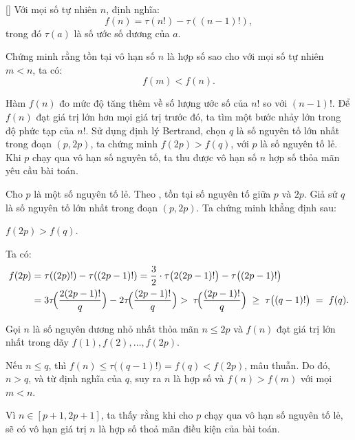 \documentclass[../04-diophantine-equations.tex]{subfiles}
\begin{document}
\begin{example*}\label{example:CHN-2015-TST3-D2-P3}[\textbf{}]
	Với mọi số tự nhiên \( n \), định nghĩa:
	\[
		f(n) = \tau(n!) - \tau((n-1)!),
	\]
	trong đó \( \tau(a) \) là số ước số dương của \( a \).  
	
	Chứng minh rằng tồn tại vô hạn số \( n \) là hợp số sao cho với mọi số tự nhiên \( m < n \), ta có:
	\[
		f(m) < f(n).
	\]
\end{example*}

\begin{story*}
    Hàm \( f(n) \) đo mức độ tăng thêm về số lượng ước số của \( n! \) so với \( (n-1)! \).  
    Để \( f(n) \) đạt giá trị lớn hơn mọi giá trị trước đó, ta tìm một bước nhảy lớn trong độ phức tạp của \( n! \).  
    Sử dụng định lý Bertrand, chọn \( q \) là số nguyên tố lớn nhất trong đoạn \( (p, 2p) \), ta chứng minh \( f(2p) > f(q) \), với \( p \) là số nguyên tố lẻ.  
    Khi \( p \) chạy qua vô hạn số nguyên tố, ta thu được vô hạn số \( n \) hợp số thỏa mãn yêu cầu bài toán.
\end{story*}

\begin{soln}\footnotemark
	Cho \( p \) là một số nguyên tố lẻ. Theo , tồn tại số nguyên tố giữa \( p \) và \( 2p \).  
	Giả sử \( q \) là số nguyên tố lớn nhất trong đoạn \( (p, 2p) \).  
	Ta chứng minh khẳng định sau:

	\begin{claim*}
		\( f(2p) > f(q) \).
	\end{claim*}

	\begin{subproof}
		Ta có:
		\[
			\begin{aligned} 
				f(2p) &= \tau((2p)!) - \tau((2p-1)!) 
				= \frac{3}{2} \cdot \tau\bigl(2(2p-1)!\bigr) - \tau\bigl((2p-1)!\bigr) \\ 
			 	&= 3\tau\!\Bigl(\frac{2(2p-1)!}{q}\Bigr) - 2\tau\!\Bigl(\frac{(2p-1)!}{q}\Bigr) 
			  	>\; \tau\!\Bigl(\frac{(2p-1)!}{q}\Bigr) \;\geq\; \tau\bigl((q-1)!\bigr) \;=\; f(q).
			\end{aligned}
		\]
	\end{subproof}

	Gọi \( n \) là số nguyên dương nhỏ nhất thỏa mãn \( n \leq 2p \) và \( f(n) \) đạt giá trị lớn nhất trong dãy \( f(1), f(2), \dots, f(2p) \).  
			
	Nếu \( n \leq q \), thì \( f(n) \leq \tau\bigl((q-1)!\bigr) = f(q) < f(2p) \), mâu thuẫn.  
	Do đó, \( n > q \), và từ định nghĩa của \( q \), suy ra \( n \) là hợp số và \( f(n) > f(m) \) với mọi \( m < n \). 
	
	Vì \( n \in [p+1, 2p+1] \), ta thấy rằng khi cho \( p \) chạy qua vô hạn số nguyên tố lẻ, sẽ có vô hạn giá trị \( n \) là hợp số thoả mãn điều kiện của bài toán.
\end{soln}

\end{document}
